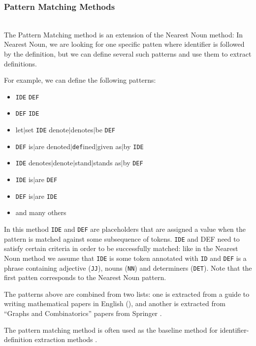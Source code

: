 \subsubsection{Pattern Matching Methods} \label{sec:pattern-matching} \ \\

The Pattern Matching method \cite{quoc2010mining} is an extension of the
Nearest Noun method: In Nearest Noun, we are looking for one specific patten
where identifier is followed by the definition, but we can define several such
patterns and use them to extract definitions.

For example, we can define the following patterns:

\begin{itemize}
\itemsep1pt\parskip0pt
  \item \texttt{IDE} \texttt{DEF}
  \item \texttt{DEF} \texttt{IDE}
  \item let$|$set \texttt{IDE} denote$|$denotes$|$be \texttt{DEF}
  \item \texttt{DEF} is$|$are denoted$|$\texttt{def}ined$|$given as$|$by \texttt{IDE}
  \item \texttt{IDE} denotes$|$denote$|$stand$|$stands as$|$by \texttt{DEF}
  \item \texttt{IDE} is$|$are \texttt{DEF}
  \item \texttt{DEF} is$|$are \texttt{IDE}
  \item and many others
\end{itemize}


In this method \texttt{IDE} and \texttt{DEF} are placeholders that are
assigned a value when the pattern is matched against some subsequence
of tokens.  \texttt{IDE} and DEF need to
satisfy certain criteria in order to be successfully matched: like in the
Nearest Noun method we assume that \texttt{IDE} is some token annotated with
\texttt{ID} and \texttt{DEF} is a phrase containing adjective (\texttt{JJ}),
nouns (\texttt{NN}) and  determiners (\texttt{DET}). Note that the first patten corresponds
to the Nearest Noun pattern.

The patterns above are combined from two lists: one is extracted from a
guide to writing mathematical papers in English (\cite{trzeciak1995writing}),
and another is extracted from ``Graphs and Combinatorics'' papers from Springer
\cite{kristianto2012extracting}.

The pattern matching method is often used as the baseline method
for identifier-definition extraction methods \cite{kristianto2012extracting}
\cite{kristianto2014extracting} \cite{pagael2014mlp}.


